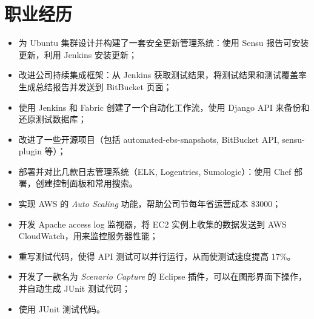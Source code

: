 \documentclass{resume}
\begin{document}
%
%


\section{职业经历}
\begin{itemize}
\item 为 Ubuntu 集群设计并构建了一套安全更新管理系统：使用 Sensu 报告可安装更新，利用 Jenkins  安装更新；
\item 改进公司持续集成框架：从 Jenkins 获取测试结果，将测试结果和测试覆盖率生成总结报告并发送到 BitBucket 页面；
\item 使用 Jenkins 和 Fabric 创建了一个自动化工作流，使用 Django API 来备份和还原测试数据库；
\item 改进了一些开源项目（包括 automated-ebs-snapshots, BitBucket API, sensu-plugin 等）；
\item 部署并对比几款日志管理系统（ELK, Logentries, Sumologic）：使用 Chef 部署，创建控制面板和常用搜索。
\end{itemize}

\begin{itemize}
\item 实现 AWS 的 \emph{Auto Scaling} 功能，帮助公司节每年省运营成本 \$3000；
\item 开发 Apache access log 监视器，将 EC2 实例上收集的数据发送到 AWS CloudWatch，用来监控服务器性能；
\item 重写测试代码，使得 API 测试可以并行运行，从而使测试速度提高 17\%。
\end{itemize}

\begin{itemize}
\item 开发了一款名为 \textit{Scenario Capture} 的 Eclipse 插件，可以在图形界面下操作，并自动生成 JUnit 测试代码；
\item 使用 JUnit 测试代码。
\end{itemize}
\end{document}
